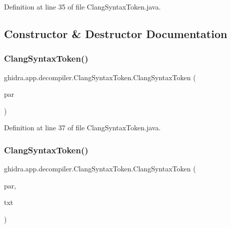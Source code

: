 Definition at line 35 of file Clang\+Syntax\+Token.\+java.



\subsection{Constructor \& Destructor Documentation}
\mbox{\label{classghidra_1_1app_1_1decompiler_1_1_clang_syntax_token_ae72cb9672083df466cbc3b145659cea3}} 
\subsubsection{\texorpdfstring{ClangSyntaxToken()}{ClangSyntaxToken()}\hspace{0.1cm}{\footnotesize\ttfamily [1/3]}}
{\footnotesize\ttfamily ghidra.\+app.\+decompiler.\+Clang\+Syntax\+Token.\+Clang\+Syntax\+Token (\begin{DoxyParamCaption}\item[{\mbox{\hyperlink{interfaceghidra_1_1app_1_1decompiler_1_1_clang_node}{Clang\+Node}}}]{par }\end{DoxyParamCaption})\hspace{0.3cm}{\ttfamily [inline]}}



Definition at line 37 of file Clang\+Syntax\+Token.\+java.

\mbox{\label{classghidra_1_1app_1_1decompiler_1_1_clang_syntax_token_a94f0661a0df9092d5600dfee3f528c91}} 
\subsubsection{\texorpdfstring{ClangSyntaxToken()}{ClangSyntaxToken()}\hspace{0.1cm}{\footnotesize\ttfamily [2/3]}}
{\footnotesize\ttfamily ghidra.\+app.\+decompiler.\+Clang\+Syntax\+Token.\+Clang\+Syntax\+Token (\begin{DoxyParamCaption}\item[{\mbox{\hyperlink{interfaceghidra_1_1app_1_1decompiler_1_1_clang_node}{Clang\+Node}}}]{par,  }\item[{String}]{txt }\end{DoxyParamCaption})\hspace{0.3cm}{\ttfamily [inline]}}



